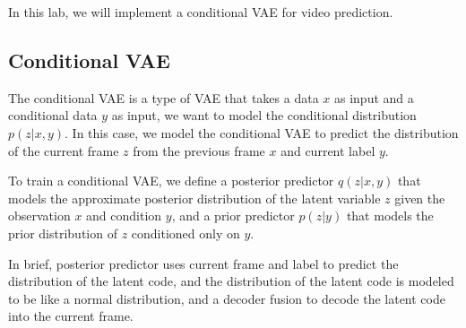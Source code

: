 In this lab, we will implement a conditional VAE for video prediction.

\subsection{Conditional VAE}
The conditional VAE is a type of VAE that takes a data $x$ as input and a conditional data $y$ as input, we want to model the conditional distribution $p(z|x, y)$.
In this case, we model the conditional VAE to predict the distribution of the current frame $z$ from the previous frame $x$ and current label $y$.

To train a conditional VAE, we define a posterior predictor $q(z|x, y)$ that models the approximate posterior distribution of the latent variable $z$ given the observation $x$ and condition $y$, and a prior predictor $p(z|y)$ that models the prior distribution of $z$ conditioned only on $y$.

In brief, posterior predictor uses current frame and label to predict the distribution of the latent code, and the distribution of the latent code is modeled to be like a normal distribution, and a decoder fusion to decode the latent code into the current frame.


